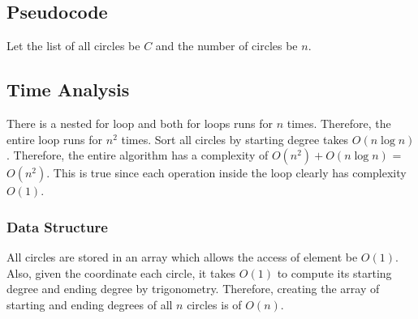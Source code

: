 \documentclass[11pt, oneside]{article}   	%
\begin{document}
\subsection{Pseudocode}
Let the list of all circles be $C$ and the number of circles be $n$.
\begin{algorithm}
\end{algorithm}
\subsection{Time Analysis}
There is a nested for loop and both for loops runs for $n$ times. Therefore, the entire loop runs for $n^2$ times. Sort all circles by starting degree takes $O(n\log n)$. Therefore, the entire algorithm has a complexity of $O(n^2)+ O(n\log n)$ = $O(n^2)$. This is true since each operation inside the loop clearly has complexity $O(1)$.
\subsubsection{Data Structure}
All circles are stored in an array which allows the access of element be $O(1)$. Also, given the coordinate each circle, it takes $O(1)$ to compute its starting degree and ending degree by trigonometry. Therefore, creating the array of starting and ending degrees of all $n$ circles is of $O(n)$.
\end{document}
